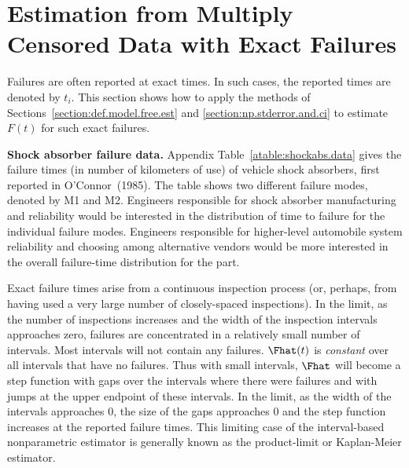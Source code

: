 \section{Estimation from Multiply Censored Data with Exact Failures}
\label{section:def.of.nonparametric.estimate}
Failures are often reported at exact times.  In such cases, the
reported times are denoted by $t_{i}$.  This section shows how to
apply the methods of Sections~\ref{section:def.model.free.est} and
\ref{section:np.stderror.and.ci}
to estimate $F(t)$ for such exact failures.


\begin{example}
\label{example:shock.absorber.data}
{\bf Shock absorber failure data.} Appendix
Table~\ref{atable:shockabs.data} gives the failure times (in number of
kilometers of use) of vehicle shock absorbers, first reported in
O'Connor~(1985). The table shows two different failure modes, denoted
by M1 and M2. Engineers responsible for shock absorber manufacturing
and reliability would be interested in the distribution of time to
failure for the individual failure modes. Engineers responsible for
higher-level automobile system reliability and choosing among
alternative vendors would be more interested in the overall
failure-time distribution for the part.
\end{example}

Exact failure times arise from a continuous
inspection process (or, perhaps, from having used a very large number
of closely-spaced inspections).  In the limit, as the number of
inspections increases and the width of the inspection intervals
approaches zero, failures are concentrated in a relatively small
number of intervals. Most intervals will not contain any failures.
$\Fhat(t)$ is {\em constant} over all intervals that have no
failures. Thus with small intervals, $\Fhat$ will become a step
function with gaps over the intervals where there were failures and
with jumps at the upper endpoint of these intervals. In the limit, as
the width of the intervals approaches $0$, the size of the gaps
approaches 0 and the step function increases at the reported failure
times. This limiting case of the interval-based nonparametric
estimator is generally known as the product-limit or Kaplan-Meier
estimator.

